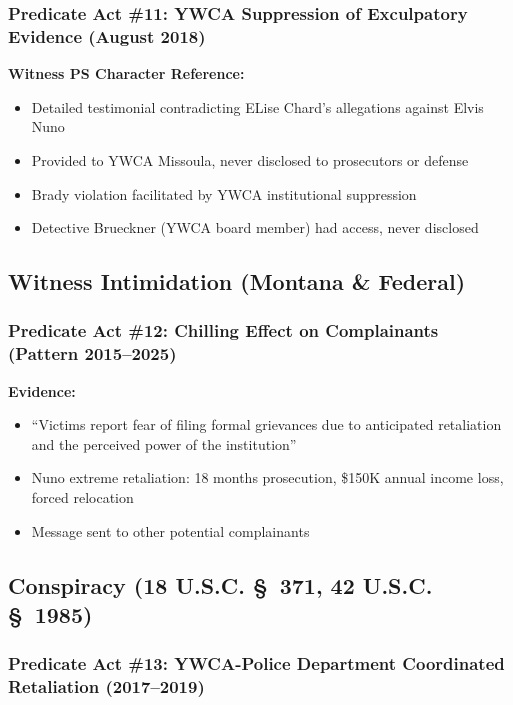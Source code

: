 \documentclass[11pt,letterpaper]{article}
\begin{document}
\subsubsection{Predicate Act \#11: YWCA Suppression of Exculpatory Evidence (August 2018)}

\textbf{Witness PS Character Reference:}
\begin{itemize}[leftmargin=*]
\item Detailed testimonial contradicting ELise Chard's allegations against Elvis Nuno
\item Provided to YWCA Missoula, never disclosed to prosecutors or defense
\item Brady violation facilitated by YWCA institutional suppression
\item Detective Brueckner (YWCA board member) had access, never disclosed
\end{itemize}

\subsection{Witness Intimidation (Montana \& Federal)}

\subsubsection{Predicate Act \#12: Chilling Effect on Complainants (Pattern 2015--2025)}

\textbf{Evidence:}
\begin{itemize}[leftmargin=*]
\item ``Victims report fear of filing formal grievances due to anticipated retaliation and the perceived power of the institution''
\item Nuno extreme retaliation: 18 months prosecution, \$150K annual income loss, forced relocation
\item Message sent to other potential complainants
\end{itemize}

\subsection{Conspiracy (18 U.S.C. \S~371, 42 U.S.C. \S~1985)}

\subsubsection{Predicate Act \#13: YWCA-Police Department Coordinated Retaliation (2017--2019)}
\end{document}
